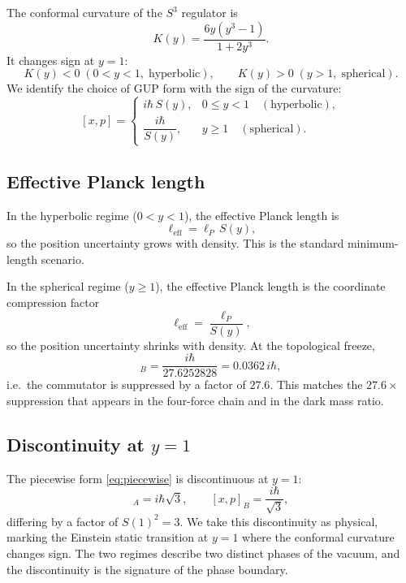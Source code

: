 \documentclass[12pt,oneside,openany]{book}
\begin{document}
The conformal curvature of the $S^{3}$ regulator is
\begin{equation}
K(y)=\frac{6y(y^{3}-1)}{1+2y^{3}}.
\label{eq:K}
\end{equation}
It changes sign at $y=1$:
\begin{equation}
K(y)<0\;(0<y<1,\;\text{hyperbolic}),
\qquad
K(y)>0\;(y>1,\;\text{spherical}).
\label{eq:K-sign}
\end{equation}
We identify the choice of GUP form with the sign of the
curvature:
\begin{equation}
\boxed{
[x,p]=
\begin{cases}
i\hbar\,S(y), & 0\le y<1\quad(\text{hyperbolic}),\\[6pt]
\dfrac{i\hbar}{S(y)}, & y\ge 1\quad(\text{spherical}).
\end{cases}}
\label{eq:piecewise}
\end{equation}

\subsection{Effective Planck length}

In the hyperbolic regime ($0<y<1$), the effective Planck length
is
\begin{equation}
\ell_{\text{eff}}=\ell_{P}\,S(y),
\label{eq:l-eff-hyp}
\end{equation}
so the position uncertainty grows with density. This is the
standard minimum-length scenario.

In the spherical regime ($y\ge 1$), the effective Planck length
is the coordinate compression factor
\begin{equation}
\ell_{\text{eff}}=\frac{\ell_{P}}{S(y)},
\label{eq:l-eff-sph}
\end{equation}
so the position uncertainty shrinks with density. At the
topological freeze,
\begin{equation}
[x,p]_{B}=\frac{i\hbar}{27.6252828}=0.0362\,i\hbar,
\label{eq:comm-freeze}
\end{equation}
i.e.\ the commutator is suppressed by a factor of $27.6$. This
matches the $27.6\times$ suppression that appears in the
four-force chain and in the dark mass ratio.

\subsection{Discontinuity at \texorpdfstring{$y=1$}{y=1}}

The piecewise form \eqref{eq:piecewise} is discontinuous at
$y=1$:
\begin{equation}
[x,p]_{A}=i\hbar\sqrt{3},
\qquad
[x,p]_{B}=\frac{i\hbar}{\sqrt{3}},
\label{eq:jump}
\end{equation}
differing by a factor of $S(1)^{2}=3$. We take this
discontinuity as physical, marking the Einstein static
transition at $y=1$ where the conformal curvature changes
sign. The two regimes describe two distinct phases of the
vacuum, and the discontinuity is the signature of the phase
boundary.
\end{document}
